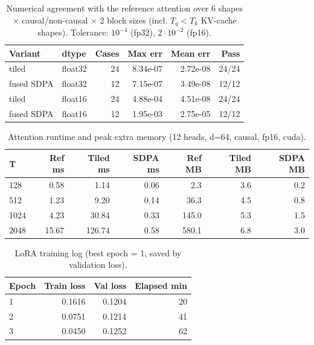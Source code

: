\begin{table}[t]
\centering
\caption{Numerical agreement with the reference attention over 6 shapes $\times$ causal/non-causal $\times$ 2 block sizes (incl. $T_q<T_k$ KV-cache shapes). Tolerance: $10^{-4}$ (fp32), $2\cdot10^{-2}$ (fp16).}
\label{tab:attn-err}
\footnotesize
\begin{tabular}{llrrrr}
\toprule
Variant & dtype & Cases & Max err & Mean err & Pass \\
\midrule
tiled & float32 & 24 & 8.34e-07 & 2.72e-08 & 24/24 \\
fused SDPA & float32 & 12 & 7.15e-07 & 3.49e-08 & 12/12 \\
tiled & float16 & 24 & 4.88e-04 & 4.51e-08 & 24/24 \\
fused SDPA & float16 & 12 & 1.95e-03 & 2.75e-05 & 12/12 \\
\bottomrule
\end{tabular}
\end{table}

\begin{table}[t]
\centering
\caption{Attention runtime and peak extra memory (12 heads, d=64, causal, fp16, cuda).}
\label{tab:attn-perf}
\footnotesize
\begin{tabular}{lrrrrrr}
\toprule
T & Ref ms & Tiled ms & SDPA ms & Ref MB & Tiled MB & SDPA MB \\
\midrule
128 & 0.58 & 1.14 & 0.06 & 2.3 & 3.6 & 0.2 \\
512 & 1.23 & 9.20 & 0.14 & 36.3 & 4.5 & 0.8 \\
1024 & 4.23 & 30.84 & 0.33 & 145.0 & 5.3 & 1.5 \\
2048 & 15.67 & 126.74 & 0.58 & 580.1 & 6.8 & 3.0 \\
\bottomrule
\end{tabular}
\end{table}

\begin{table}[t]
\centering
\caption{LoRA training log (best epoch = 1, saved by validation loss).}
\label{tab:train}
\footnotesize
\begin{tabular}{lrrr}
\toprule
Epoch & Train loss & Val loss & Elapsed min \\
\midrule
1 & 0.1616 & 0.1204 & 20 \\
2 & 0.0751 & 0.1214 & 41 \\
3 & 0.0450 & 0.1252 & 62 \\
\bottomrule
\end{tabular}
\end{table}
